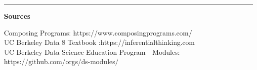 \documentclass[11pt]{article}
\begin{document}
\begin{center}\rule{0.5\linewidth}{\linethickness}\end{center}

\textbf{Sources}

Composing Programs: https://www.composingprograms.com/\\
UC Berkeley Data 8 Textbook :https://inferentialthinking.com\\
UC Berkeley Data Science Education Program - Modules:
https://github.com/orgs/ds-modules/


    
    
    
    
\end{document}
